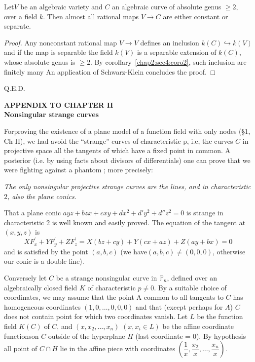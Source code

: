 \begin{corollary}[de Franchis]\label{chap2:sec4:coro3}%
  Let\pageoriginale $V$ be an algebraic variety and  $C$ an algebraic curve of
  absolute genus $\ge 2$, over a field $k$. Then almost all rational
  maps $V\rightarrow C$ are either constant or separate. 
\end{corollary}

\begin{proof}%
  Any nonconstant rational map $V\longrightarrow V $ defines an
  inclusion $k(C)\hookrightarrow k(V)$ and if the map is separable the
  field $k(V)$ is a separable extension of $k(C)$, whose absolute
  genus is $\ge 2$. By corollary~\ref{chap2:sec4:coro2}, such inclusion are finitely
  many An application of Schwarz-Klein concludes the proof. 
\end{proof}
\hfill{Q.E.D.}
\newpage

\thispagestyle{empty}

\noindent 
\begin{center}
  \textbf{\LARGE APPENDIX TO CHAPTER II}\\[10pt]
  \textbf{\LARGE Nonsingular strange curves} 
\end{center}

For\pageoriginale proving the existence of a plane model of a function field with
only nodes (\S 1, Ch II), we had avoid the ``strange'' curves of
characteristic p, i.e, the curves $C$ in projective  space all the
tangents of which have a fixed point in common. A posterior (i.e. by
using facts about divisors of differentials) one can prove that we were
fighting against a phantom ; more precisely: 


\begin{theorem*}%
  \textit{The only nonsingular projective strange curves are the lines,
    and in characteristic $2$, also the plane conics}. 
\end{theorem*}

That a plane conic $ayz + bzx + cxy + dx^2 + d'y^2 + d''z^2=0$ is
strange in characteristic 2 is well known and easily proved. The
equation of the tangent at $(x,y,z)$ is 
$$
XF^{'}_{x} + YF^{'}_{y} + ZF^{'}_{z} = X(bz+cy) + Y(cx+az) + Z(ay+bx)=0
$$   
and is satisfied by the point $(a,b,c)$ (we have$(a,b,c)\neq (0,0,0)$,
otherwise our conic is a double line). 

Conversely let $C$ be a strange nonsingular curve in $\mathbb{P}_n$,
defined over an algebraically closed field $K$ of characteristic $p\neq
0$. By a suitable choice of coordinates, we may assume that the point
A common to all tangents to $C$ has homogeneous coordinates
$(1,0,\ldots,0,0,0)$ and that (except perhaps for $A$) $C$ does not
contain point for which two coordinates vanish. Let $L$ be the
function field $K(C)$ of $C$, and $(x, x_2,\ldots , x_n)$ $(x,x_i \in
L)$ be the affine coordinate functions\pageoriginale on $C$ outside of the
hyperplane $H$ (last coordinate = 0). By hypothesis all point of
$C\cap H$ lie in the affine piece with coordinates
$\left(\dfrac{1}{x},\dfrac{x_2}{x},\ldots ,\dfrac{x_n}{x}\right)$. 

